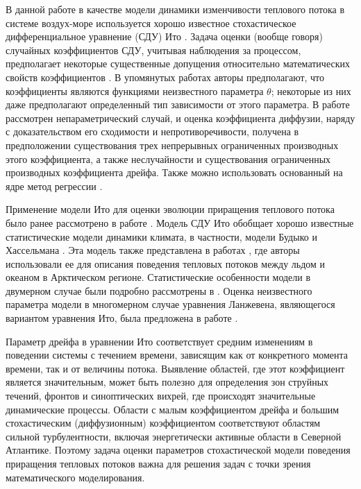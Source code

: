 В данной работе в качестве модели динамики изменчивости теплового потока в системе воздух-море используется хорошо известное стохастическое дифференциальное уравнение (СДУ) Ито \cite{Pascucci2022}. Задача оценки (вообще говоря) случайных коэффициентов СДУ, учитывая наблюдения за процессом, предполагает некоторые существенные допущения относительно математических свойств коэффициентов \cite{Yoshida1992, GenonCatalot1993, GenonCatalot1994, Wei2016}. В упомянутых работах авторы предполагают, что коэффициенты являются функциями неизвестного параметра $\theta$; некоторые из них даже предполагают определенный тип зависимости от этого параметра. В работе \cite{FlorensZmirou1993} рассмотрен непараметрический случай, и оценка коэффициента диффузии, наряду с доказательством его сходимости и непротиворечивости, получена в предположении существования трех непрерывных ограниченных производных этого коэффициента, а также неслучайности и существования ограниченных производных коэффициента дрейфа. Также можно использовать основанный на ядре метод регрессии \cite{Lamouroux2009}.

Применение модели Ито для оценки эволюции приращения теплового потока было ранее рассмотрено в работе \cite{2021_SOME_FEATURES}. Модель СДУ Ито обобщает хорошо известные статистические модели динамики климата, в частности, модели Будыко \cite{Budyko1974} и Хассельмана \cite{Hasselmann1976}. Эта модель также представлена в работах \cite{van2021characterisation, toppaladoddi2021stochastic}, где авторы использовали ее для описания поведения тепловых потоков между льдом и океаном в Арктическом регионе. Статистические особенности модели в двумерном случае были подробно рассмотрены в \cite{Pascucci2022}. Оценка неизвестного параметра модели в многомерном случае уравнения Ланжевена, являющегося вариантом уравнения Ито, была предложена в работе \cite{Voutilainen2022}.

Параметр дрейфа в уравнении Ито соответствует средним изменениям в поведении системы с течением времени, зависящим как от конкретного момента времени, так и от величины потока. Выявление областей, где этот коэффициент является значительным, может быть полезно для определения зон струйных течений, фронтов и синоптических вихрей, где происходят значительные динамические процессы. Области с малым коэффициентом дрейфа и большим стохастическим (диффузионным) коэффициентом соответствуют областям сильной турбулентности, включая энергетически активные области в Северной Атлантике. Поэтому задача оценки параметров стохастической модели поведения приращения тепловых потоков важна для решения задач с точки зрения математического моделирования.

